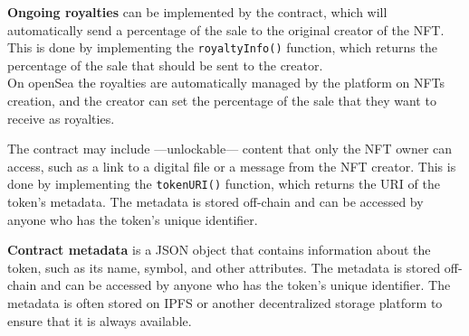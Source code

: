 \textbf{Ongoing royalties }can be implemented by the contract, which will automatically send a percentage of the sale to the original creator of the NFT. This is done by implementing the \texttt{royaltyInfo()} function, which returns the percentage of the sale that should be sent to the creator.\\
On openSea the royalties are automatically managed by the platform on NFTs creation, and the creator can set the percentage of the sale that they want to receive as royalties.
\nl

The contract may include ---unlockable--- content that only the NFT owner can access, such as a link to a digital file or a message from the NFT creator. This is done by implementing the \texttt{tokenURI()} function, which returns the URI of the token's metadata. The metadata is stored off-chain and can be accessed by anyone who has the token's unique identifier.
\nl

\textbf{Contract metadata} is a JSON object that contains information about the token, such as its name, symbol, and other attributes. The metadata is stored off-chain and can be accessed by anyone who has the token's unique identifier. The metadata is often stored on IPFS or another decentralized storage platform to ensure that it is always available.
